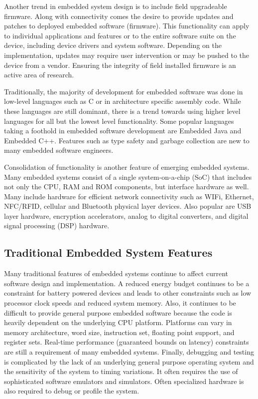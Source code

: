 \documentclass[final,conference,10pt]{IEEEtran}
\begin{document}
Another trend in embedded system design is to include field upgradeable firmware.  Along with connectivity comes the desire to provide updates and patches to deployed embedded software (firmware).  This functionality can apply to individual applications and features or to the entire software suite on the device, including device drivers and system software.  Depending on the implementation, updates may require user intervention or may be pushed to the device from a vendor.  Ensuring the integrity of field installed firmware is an active area of research.

Traditionally, the majority of development for embedded software was done in low-level languages such as C or in architecture specific assembly code.  While these languages are still dominant, there is a trend towards using higher level languages for all but the lowest level functionality.  Some popular languages taking a foothold in embedded software development are Embedded Java and Embedded C++. Features such as type safety and garbage collection are new to many embedded software engineers.

Consolidation of functionality is another feature of emerging embedded systems.  Many embedded systems consist of a single system-on-a-chip (SoC) that includes not only the CPU, RAM and ROM components, but interface hardware as well.  Many include hardware for efficient network connectivity such as WIFi, Ethernet, NFC/RFID, cellular and Bluetooth physical layer devices.  Also popular are USB layer hardware, encryption accelerators, analog to digital converters, and digital signal processing (DSP) hardware. 

\subsection{Traditional Embedded System Features}

Many traditional features of embedded systems continue to affect current software design and implementation.  A reduced energy budget continues to be a constraint for battery powered devices and leads to other constraints such as low processor clock speeds and reduced system memory.  Also, it continues to be difficult to provide general purpose embedded software because the code is heavily dependent on the underlying CPU platform.  Platforms can vary in memory architecture, word size, instruction set, floating point support, and register sets.  Real-time performance (guaranteed bounds on latency) constraints are still a requirement of many embedded systems. Finally, debugging and testing is complicated by the lack of an underlying general purpose operating system and the sensitivity of the system to timing variations.  It often requires the use of sophisticated software emulators and simulators.  Often specialized hardware is also required to debug or profile the system.
\end{document}
